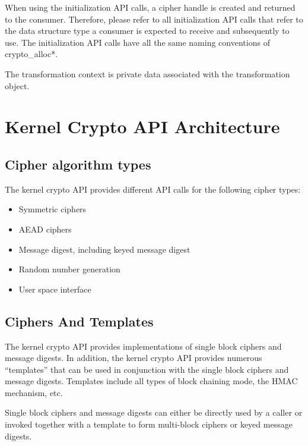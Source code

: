 \documentclass[a4paper,8pt,english]{sphinxmanual}
\begin{document}
When using the initialization API calls, a cipher handle is created and
returned to the consumer. Therefore, please refer to all initialization
API calls that refer to the data structure type a consumer is expected
to receive and subsequently to use. The initialization API calls have
all the same naming conventions of crypto\_alloc*.

The transformation context is private data associated with the
transformation object.


\chapter{Kernel Crypto API Architecture}
\label{crypto/architecture::doc}\label{crypto/architecture:kernel-crypto-api-architecture}

\section{Cipher algorithm types}
\label{crypto/architecture:cipher-algorithm-types}
The kernel crypto API provides different API calls for the following
cipher types:
\begin{itemize}
\item {} 
Symmetric ciphers

\item {} 
AEAD ciphers

\item {} 
Message digest, including keyed message digest

\item {} 
Random number generation

\item {} 
User space interface

\end{itemize}


\section{Ciphers And Templates}
\label{crypto/architecture:ciphers-and-templates}
The kernel crypto API provides implementations of single block ciphers
and message digests. In addition, the kernel crypto API provides
numerous ``templates'' that can be used in conjunction with the single
block ciphers and message digests. Templates include all types of block
chaining mode, the HMAC mechanism, etc.

Single block ciphers and message digests can either be directly used by
a caller or invoked together with a template to form multi-block ciphers
or keyed message digests.
\end{document}
